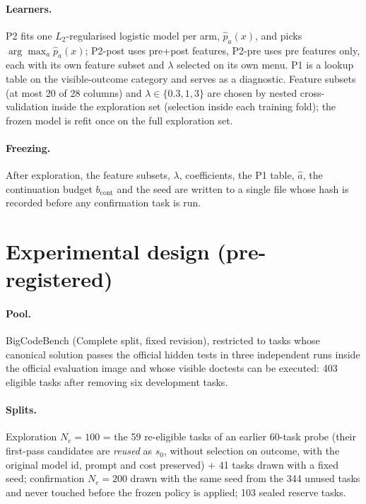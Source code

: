 \documentclass{article}
\newif\ifdraftmode
\newcommand{\draftnote}[1]{\ifdraftmode{\color{red}\textbf{[DRAFT: #1]}}\else\PackageError{main}{draftnote left in submission build: #1}{}\fi}
\begin{document}
\paragraph{Learners.} P2 fits one $L_2$-regularised logistic model per arm, $\hat p_a(x)$, and picks $\arg\max_a\hat p_a(x)$; P2-post
uses pre+post features, P2-pre uses pre features only, each with its own feature subset and $\lambda$ selected on its own menu. P1 is a
lookup table on the visible-outcome category and serves as a diagnostic. Feature subsets (at most 20 of 28 columns) and
$\lambda\in\{0.3,1,3\}$ are chosen by nested cross-validation inside the exploration set (selection inside each training fold); the
frozen model is refit once on the full exploration set. \draftnote{The exact procedure is \texttt{gap\_analysis.explore\_fit}; the same
function drives the simulator (Appendix).}

\paragraph{Freezing.} After exploration, the feature subsets, $\lambda$, coefficients, the P1 table, $\hat a$, the continuation budget
$b_{\mathrm{cont}}$ and the seed are written to a single file whose hash is recorded before any confirmation task is run.

\section{Experimental design (pre-registered)}
\label{sec:design}
\paragraph{Pool.} BigCodeBench (Complete split, fixed revision), restricted to tasks whose canonical solution passes the official hidden
tests in three independent runs inside the official evaluation image and whose visible doctests can be executed: 403 eligible tasks
after removing six development tasks. \draftnote{eligibility: gate1 411, gate2 408, history-stable 407, eligible 403 --- cite
bcb\_eligibility.json.}

\paragraph{Splits.} Exploration $N_e=100$ = the 59 re-eligible tasks of an earlier 60-task probe (their first-pass candidates are
\emph{reused} as $s_0$, without selection on outcome, with the original model id, prompt and cost preserved) + 41 tasks drawn with a
fixed seed; confirmation $N_c=200$ drawn with the same seed from the 344 unused tasks and never touched before the frozen policy is
applied; 103 sealed reserve tasks.
\end{document}
